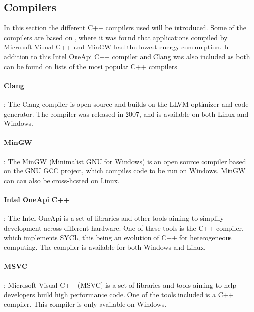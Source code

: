 \subsection{Compilers}

In this section the different C++ compilers used will be introduced. Some of the compilers are based on \cite{hassan2017}, where it was found that applications compiled by Microsoft Visual C++ and MinGW had the lowest energy consumption. In addition to this Intel OneApi C++ compiler and Clang was also included as both can be found on lists of the most popular C++ compilers\cite{mycplus, educba, softwaretestinghelp}. 



\paragraph{Clang}: The Clang compiler is open source and builds on the LLVM optimizer and code generator. The compiler was released in 2007, and is available on both Linux and Windows.\cite{clang}

\paragraph*{MinGW}: The MinGW (Minimalist GNU for Windows) is an open source compiler based on the GNU GCC project, which compiles code to be run on Windows. MinGW can can also be cross-hosted on Linux.\cite{mingw}

\paragraph*{Intel OneApi C++}: The Intel OneApi is a set of libraries and other tools aiming to simplify development across different hardware. One of these tools is the C++ compiler, which implements SYCL, this being an evolution of C++ for heterogeneous computing. The compiler is available for both Windows and Linux.\cite{oneapi}

\paragraph*{MSVC}: Microsoft Visual C++ (MSVC) is a set of libraries and tools aiming to help developers build high performance code. One of the tools included is a C++ compiler. This compiler is only available on Windows.\cite{msvc}
